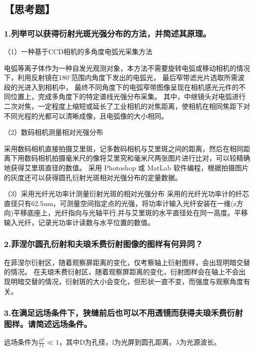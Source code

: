 \documentclass[12pt,a4paper,UTF8]{ctexart}
\begin{document}
\subsection*{【思考题】}
\subsubsection*{1.列举可以获得衍射光斑光强分布的方法，并简述其原理。}
（1）一种基于CCD相机的多角度电弧光采集方法

电弧等离子体作为一种自发光观测对象，本方法不需要旋转电弧或移动相机的情况下，利用反射镜在180$^{\circ}$范围内角度下发出的电弧光，
最后窄带滤光片选取所需波段的光进入到相机中，
最终不同角度下的电弧窄带图像呈现在相机感光元件的不同位置上，完成多角度下的特定谱线光强分布采集。
其中，中继镜头对电弧进行二次对焦，一定程度上缩短或延长了工业相机的对焦距离，使相机在相同焦距下对不同光程的光都可以清晰成像，且电弧像的大小相同。

（2）数码相机测量相对光强分布

采用数码相机直接拍摄艾里斑，记多数码相机与艾里斑之间的距离，然后在相同距离下用数码相机拍摄毫米尺的像将艾里究和毫米尺两张图片进行比对，可以较精确地获得艾里斑直径的数值。
采用 Photoshop 或 MatLab 软件编程，根据拍摄图片的灰度还可以获得圆孔衍射光斑相对光强分布的定量数据。

（3）采用光纤光功率计测量衍射光斑的相对光强分布
采用的光纤光功率计的纤芯直径只有62.5um，可测量空间指定点的光强，将功率计输入光纤安装在一维(z方向)平移底座上，光纤指向与光轴平行,并与艾里斑的水平直径处在同一高度。平移输入光纤，记录光功率计读数与水平位置的数值。

\subsubsection*{2.菲涅尔圆孔衍射和夫琅禾费衍射图像的图样有何异同？}
在菲涅尔衍射区，随着观察屏距离的变化，仅考察轴上衍射图样，会出现明暗交替的情况。
在夫琅禾费衍射区，随着观察屏距离的变化，衍射图样会在轴上不会出现明暗交替的情况，衍射斑的大小会变化，但形状一直不变，而强度与观察角度有关。

\subsubsection*{3.在满足远场条件下，狭缝前后也可以不用透镜而获得夫琅禾费衍射图样。请简述远场条件。}
远场条件为$\frac{D^2}{l\lambda}\ll 1$，其中D为孔径，l为光屏到圆孔距离，$\lambda$为光源波长。
\end{document}
